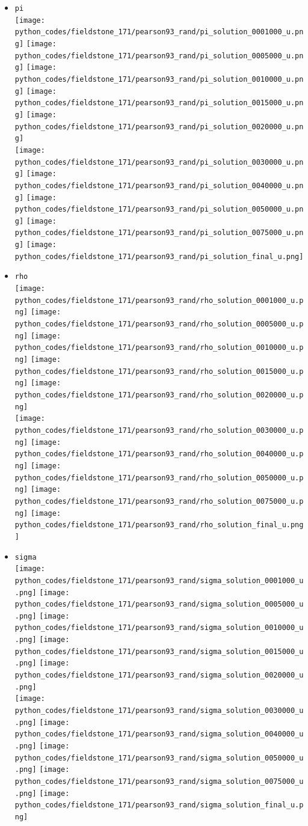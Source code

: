 \begin{itemize}
\item {\tt pi}\\
\texttt{[image: python\_codes/fieldstone\_171/pearson93\_rand/pi\_solution\_0001000\_u.png]}
\texttt{[image: python\_codes/fieldstone\_171/pearson93\_rand/pi\_solution\_0005000\_u.png]}
\texttt{[image: python\_codes/fieldstone\_171/pearson93\_rand/pi\_solution\_0010000\_u.png]}
\texttt{[image: python\_codes/fieldstone\_171/pearson93\_rand/pi\_solution\_0015000\_u.png]}
\texttt{[image: python\_codes/fieldstone\_171/pearson93\_rand/pi\_solution\_0020000\_u.png]}\\
\texttt{[image: python\_codes/fieldstone\_171/pearson93\_rand/pi\_solution\_0030000\_u.png]}
\texttt{[image: python\_codes/fieldstone\_171/pearson93\_rand/pi\_solution\_0040000\_u.png]}
\texttt{[image: python\_codes/fieldstone\_171/pearson93\_rand/pi\_solution\_0050000\_u.png]}
\texttt{[image: python\_codes/fieldstone\_171/pearson93\_rand/pi\_solution\_0075000\_u.png]}
\texttt{[image: python\_codes/fieldstone\_171/pearson93\_rand/pi\_solution\_final\_u.png]}

\item {\tt rho}\\
\texttt{[image: python\_codes/fieldstone\_171/pearson93\_rand/rho\_solution\_0001000\_u.png]}
\texttt{[image: python\_codes/fieldstone\_171/pearson93\_rand/rho\_solution\_0005000\_u.png]}
\texttt{[image: python\_codes/fieldstone\_171/pearson93\_rand/rho\_solution\_0010000\_u.png]}
\texttt{[image: python\_codes/fieldstone\_171/pearson93\_rand/rho\_solution\_0015000\_u.png]}
\texttt{[image: python\_codes/fieldstone\_171/pearson93\_rand/rho\_solution\_0020000\_u.png]}\\
\texttt{[image: python\_codes/fieldstone\_171/pearson93\_rand/rho\_solution\_0030000\_u.png]}
\texttt{[image: python\_codes/fieldstone\_171/pearson93\_rand/rho\_solution\_0040000\_u.png]}
\texttt{[image: python\_codes/fieldstone\_171/pearson93\_rand/rho\_solution\_0050000\_u.png]}
\texttt{[image: python\_codes/fieldstone\_171/pearson93\_rand/rho\_solution\_0075000\_u.png]}
\texttt{[image: python\_codes/fieldstone\_171/pearson93\_rand/rho\_solution\_final\_u.png]}

\item {\tt sigma}\\
\texttt{[image: python\_codes/fieldstone\_171/pearson93\_rand/sigma\_solution\_0001000\_u.png]}
\texttt{[image: python\_codes/fieldstone\_171/pearson93\_rand/sigma\_solution\_0005000\_u.png]}
\texttt{[image: python\_codes/fieldstone\_171/pearson93\_rand/sigma\_solution\_0010000\_u.png]}
\texttt{[image: python\_codes/fieldstone\_171/pearson93\_rand/sigma\_solution\_0015000\_u.png]}
\texttt{[image: python\_codes/fieldstone\_171/pearson93\_rand/sigma\_solution\_0020000\_u.png]}\\
\texttt{[image: python\_codes/fieldstone\_171/pearson93\_rand/sigma\_solution\_0030000\_u.png]}
\texttt{[image: python\_codes/fieldstone\_171/pearson93\_rand/sigma\_solution\_0040000\_u.png]}
\texttt{[image: python\_codes/fieldstone\_171/pearson93\_rand/sigma\_solution\_0050000\_u.png]}
\texttt{[image: python\_codes/fieldstone\_171/pearson93\_rand/sigma\_solution\_0075000\_u.png]}
\texttt{[image: python\_codes/fieldstone\_171/pearson93\_rand/sigma\_solution\_final\_u.png]}


\end{itemize}
